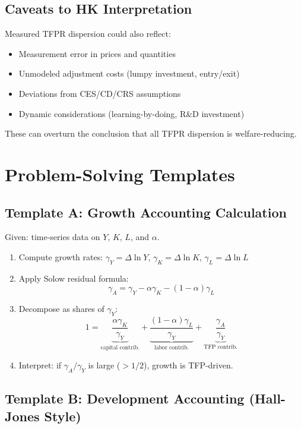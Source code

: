 \documentclass[a4paper,11pt]{article}
\newcommand{\gA}{\gamma_{A}}
\newcommand{\gY}{\gamma_{Y}}
\newcommand{\gK}{\gamma_{K}}
\newcommand{\gL}{\gamma_{L}}
\begin{document}
\subsection*{Caveats to HK Interpretation}

Measured TFPR dispersion could also reflect:
\begin{itemize}[noitemsep]
    \item Measurement error in prices and quantities
    \item Unmodeled adjustment costs (lumpy investment, entry/exit)
    \item Deviations from CES/CD/CRS assumptions
    \item Dynamic considerations (learning-by-doing, R\&D investment)
\end{itemize}
These can overturn the conclusion that all TFPR dispersion is welfare-reducing.

\clearpage

\section{Problem-Solving Templates}

\subsection*{Template A: Growth Accounting Calculation}

Given: time-series data on $Y$, $K$, $L$, and $\alpha$.

\begin{enumerate}
    \item Compute growth rates: $\gY = \Delta \ln Y$, $\gK = \Delta \ln K$, $\gL = \Delta \ln L$
    \item Apply Solow residual formula:
    \[
    \gA = \gY - \alpha \gK - (1-\alpha)\gL
    \]
    \item Decompose as shares of $\gY$:
    \[
    1 = \underbrace{\frac{\alpha \gK}{\gY}}_{\text{capital contrib.}} + \underbrace{\frac{(1-\alpha)\gL}{\gY}}_{\text{labor contrib.}} + \underbrace{\frac{\gA}{\gY}}_{\text{TFP contrib.}}
    \]
    \item Interpret: if $\gA / \gY$ is large ($> 1/2$), growth is TFP-driven.
\end{enumerate}

\subsection*{Template B: Development Accounting (Hall-Jones Style)}
\end{document}
